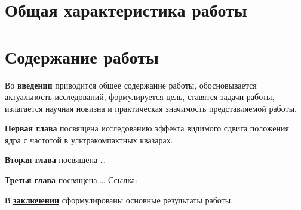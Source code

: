 \section*{Общая характеристика работы}

\newcommand{\actuality}{\pdfbookmark[1]{Актуальность}{actuality}\underline{\textbf{\actualityTXT}}}
\newcommand{\progress}{\pdfbookmark[1]{Разработанность темы}{progress}\underline{\textbf{\progressTXT}}}
\newcommand{\aim}{\pdfbookmark[1]{Цели}{aim}\underline{{\textbf\aimTXT}}}
\newcommand{\tasks}{\pdfbookmark[1]{Задачи}{tasks}\underline{\textbf{\tasksTXT}}}
\newcommand{\aimtasks}{\pdfbookmark[1]{Цели и задачи}{aimtasks}\aimtasksTXT}
\newcommand{\novelty}{\pdfbookmark[1]{Научная новизна}{novelty}\underline{\textbf{\noveltyTXT}}}
\newcommand{\influence}{\pdfbookmark[1]{Практическая значимость}{influence}\underline{\textbf{\influenceTXT}}}
\newcommand{\methods}{\pdfbookmark[1]{Методология и методы исследования}{methods}\underline{\textbf{\methodsTXT}}}
\newcommand{\defpositions}{\pdfbookmark[1]{Положения, выносимые на защиту}{defpositions}\underline{\textbf{\defpositionsTXT}}}
\newcommand{\reliability}{\pdfbookmark[1]{Достоверность}{reliability}\underline{\textbf{\reliabilityTXT}}}
\newcommand{\probation}{\pdfbookmark[1]{Апробация}{probation}\underline{\textbf{\probationTXT}}}
\newcommand{\contribution}{\pdfbookmark[1]{Личный вклад}{contribution}\underline{\textbf{\contributionTXT}}}
\newcommand{\publications}{\pdfbookmark[1]{Публикации}{publications}\underline{\textbf{\publicationsTXT}}}



\section*{Содержание работы}

Во \textbf{введении} приводится общее содержание работы, обосновывается актуальность
исследований, формулируется цель, ставятся задачи работы, излагается научная новизна
и практическая значимость представляемой работы.

\textbf{Первая глава} посвящена исследованию эффекта видимого сдвига положения ядра с частотой в
ультракомпактных квазарах.

\textbf{Вторая глава} посвящена \dots

\textbf{Третья глава} посвящена \dots
Ссылка: \cite{Blandford_Konigl_1979}

В \underline{\textbf{заключении}} сформулированы основные результаты работы.
